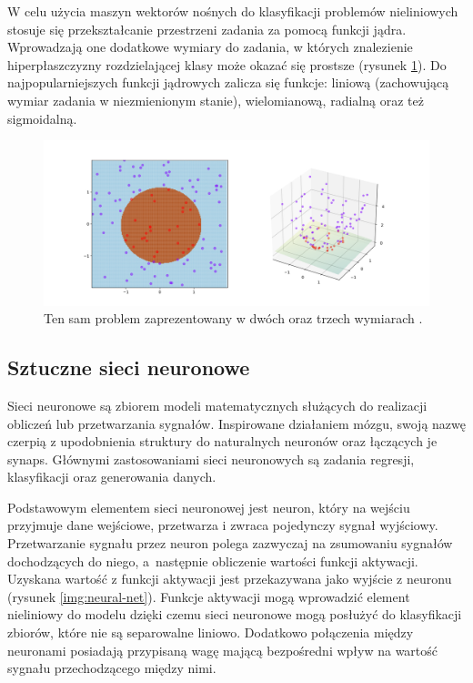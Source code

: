 \documentclass[a4paper, twoside, 11pt, openright]{article}
\begin{document}
W celu użycia maszyn wektorów nośnych do klasyfikacji problemów nieliniowych stosuje się przekształcanie przestrzeni zadania za pomocą funkcji jądra. Wprowadzają one dodatkowe wymiary do zadania, w których znalezienie hiperpłaszczyzny rozdzielającej klasy może okazać się prostsze (rysunek \ref{img:wiki_svm2}). Do najpopularniejszych funkcji jądrowych zalicza się funkcje: liniową (zachowującą wymiar zadania w niezmienionym stanie), wielomianową, radialną oraz też sigmoidalną.


\begin{figure}[H]
\centering \includegraphics[scale=0.2]{img/svm2.png}
\caption{Ten sam problem zaprezentowany w dwóch oraz trzech wymiarach \cite{wikisvm}.}
\label{img:wiki_svm2}
\end{figure}


\subsection{Sztuczne sieci neuronowe}

Sieci neuronowe \cite{neural-nets} są zbiorem modeli matematycznych służących do realizacji obliczeń lub przetwarzania sygnałów. Inspirowane działaniem mózgu, swoją nazwę czerpią z upodobnienia struktury do naturalnych neuronów oraz łączących je synaps. Głównymi zastosowaniami sieci neuronowych są zadania regresji, klasyfikacji oraz generowania danych. 

\bigskip

Podstawowym elementem sieci neuronowej jest neuron, który na wejściu przyjmuje dane wejściowe, przetwarza i zwraca pojedynczy sygnał wyjściowy. Przetwarzanie sygnału przez neuron polega zazwyczaj na zsumowaniu sygnałów dochodzących do niego, a~następnie obliczenie wartości funkcji aktywacji. Uzyskana wartość z funkcji aktywacji jest przekazywana jako wyjście z neuronu (rysunek \ref{img:neural-net}). Funkcje aktywacji mogą wprowadzić element nieliniowy do modelu dzięki czemu sieci neuronowe mogą posłużyć do klasyfikacji zbiorów, które nie są separowalne liniowo. Dodatkowo połączenia między neuronami posiadają przypisaną wagę mającą bezpośredni wpływ na wartość sygnału przechodzącego między nimi.
\end{document}
